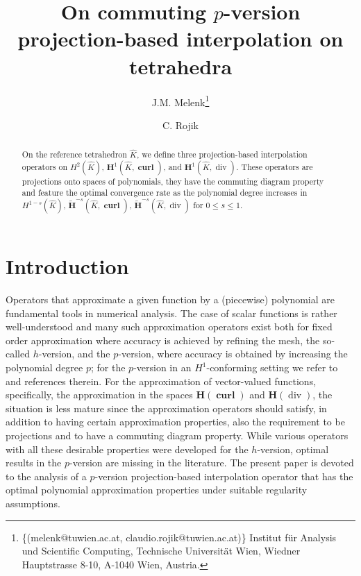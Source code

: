 \documentclass{article}
\begin{document}
\title{On commuting $p$-version projection-based interpolation on tetrahedra}
\author{J.M. Melenk\thanks{\{(melenk@tuwien.ac.at, claudio.rojik@tuwien.ac.at)\} Institut f\"{u}r Analysis und
Scientific Computing, Technische Universit\"{a}t Wien, Wiedner Hauptstrasse
8-10, A-1040 Wien, Austria.}
\and C. Rojik\footnotemark[1]}
\maketitle


\begin{abstract}
On the reference tetrahedron $\widehat K$, we define three projection-based interpolation operators 
on $H^2(\widehat K)$, ${\mathbf H}^1(\widehat K,\operatorname{\mathbf{curl}})$, 
and ${\mathbf H}^1(\widehat K,\operatorname{div})$.  
These operators are projections onto spaces of polynomials, they have the commuting diagram
property and feature the optimal convergence rate as the polynomial degree increases
in $H^{1-s}(\widehat K)$, $\widetilde{\mathbf{H}}^{-s}(\widehat K,\operatorname{\mathbf{curl}})$, 
$\widetilde{\mathbf{H}}^{-s}(\widehat K,\operatorname{div})$ for $0 \leq s \leq 1$. 
\end{abstract}

\maketitle

\section{Introduction} 
Operators that approximate a given function by a (piecewise) polynomial are 
fundamental tools in numerical analysis. The case of scalar functions is 
rather well-understood and many such approximation operators exist both for 
fixed order approximation where accuracy is achieved by refining the mesh, 
the so-called $h$-version, and the $p$-version, 
where accuracy is obtained by increasing the polynomial degree $p$; for the $p$-version
in an $H^1$-conforming setting 
we refer to \cite{babuska-suri94,SchwabhpBook,apel-melenk17} and references therein. 
For the approximation of vector-valued functions, specifically, the approximation 
in the spaces ${\mathbf H}(\operatorname{\mathbf{curl}})$ and 
${\mathbf H}(\operatorname{div})$, the situation is less mature since the approximation 
operators should satisfy, in addition to having certain approximation properties, 
also the requirement to be projections and to have a commuting diagram property. 
While various operators with all these desirable properties were developed for the $h$-version, 
optimal results in the $p$-version are missing in the literature. The present paper is devoted to the 
analysis of a $p$-version projection-based interpolation operator that has the optimal 
polynomial approximation properties under suitable regularity assumptions. 
\end{document}
